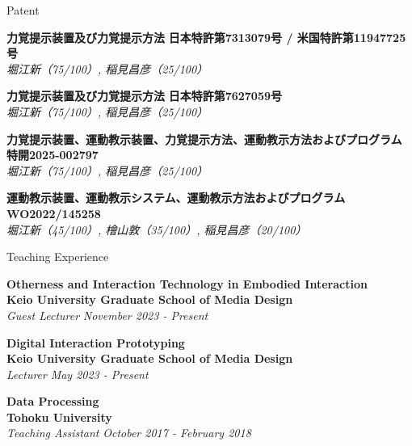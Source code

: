 \documentclass{resume} %
\begin{document}
\begin{rSection}{Patent}

{\bf 力覚提示装置及び力覚提示方法} \hfill {\bf 日本特許第7313079号 / 米国特許第11947725号}
\\{\em 堀江新（75/100）, 稲見昌彦（25/100）} \hfill {\em }

{\bf 力覚提示装置及び力覚提示方法} \hfill {\bf 日本特許第7627059号}
\\{\em 堀江新（75/100）, 稲見昌彦（25/100）} \hfill {\em }

{\bf 力覚提示装置、運動教示装置、力覚提示方法、運動教示方法およびプログラム} \hfill {\bf 特開2025-002797}
\\{\em 堀江新（75/100）, 稲見昌彦（25/100）} \hfill {\em }

{\bf 運動教示装置、運動教示システム、運動教示方法およびプログラム} \hfill {\bf WO2022/145258}
\\{\em 堀江新（45/100）, 檜山敦（35/100）, 稲見昌彦（20/100）} \hfill {\em }

\end{rSection}

\begin{rSection}{Teaching Experience}

{\bf Otherness and Interaction Technology in Embodied Interaction} 
\\{\bf Keio University Graduate School of Media Design} 
\\{\em Guest Lecturer} \hfill {\em November 2023 - Present}

{\bf Digital Interaction Prototyping} 
\\{\bf Keio University Graduate School of Media Design} 
\\{\em Lecturer} \hfill {\em May 2023 - Present}

{\bf Data Processing}
\\{\bf Tohoku University} 
\\{\em Teaching Assistant} \hfill {\em October 2017 - February 2018}

\end{rSection}
\end{document}
